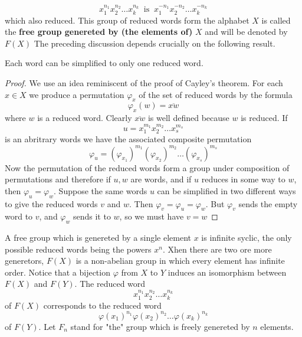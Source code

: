  \begin{equation*}
     x_1^{n_1}x_2^{n_2}\dotsc x_k^{n_k} \ \text{ is }\  x_1^{-n_1}x_2^{-n_2}\dotsc x_k^{-n_k}
 \end{equation*}
 which also reduced. This group of reduced words form the alphabet $X$ is called the \textbf{free group genereted by (the elements of) } $X$ and will be denoted by $F(X)$
 The preceding discussion depends crucially on the following result.

 \begin{theoreme}\label{reducedword}
     Each word can be simplified to only one reduced word.
 \end{theoreme}

 \begin{proof}
     We use an idea reminiscent of the proof of Cayley's theorem. For each $x\in X$ we produce a permutation $\varphi_x$ of the set of reduced words by the formula
     \begin{equation*}
         \varphi_x(w)=\overline{xw}
     \end{equation*}
     where $w$ is a reduced word. Clearly $\overline{xw}$ is well defined because $w$ is reduced. If
     \begin{equation*}
         u=x_1^{m_1}x_2^{m_2}\dotsc x_s^{m_s}
     \end{equation*}
     is an abritrary words we have the associated composite permutation
     \begin{equation*}
         \varphi_u=(\varphi_{x_1})^{m_1}(\varphi_{x_2})^{m_2}\dotsc(\varphi_{x_s})^{m_s}
     \end{equation*}
     Now the permutation of the reduced words form a group under composition of permutations and therefore if $u,w$ are words, and if $u$ reduces in some way to $w$, then $\varphi_u=\varphi_w$. Suppose the same words $u$ can be simplified in two different ways to give the reduced words $v$ and $w$. Then $\varphi_v=\varphi_{u}=\varphi_w$. But $\varphi_v$ sends the empty word to $v$, and $\varphi_w$ sends it to $w$, so we must have $v=w$
 \end{proof}

A free group which is genereted by a single element $x$ is infinite syclic, the only possible reduced words being the powers $x^n$. Xhen there are two ore more generetors, $F(X)$ is a non-abelian group  in which every element has infinite order. Notice that a bijection $\varphi$ from $X$ to $Y$ induces an isomorphism between $F(X)$ and $F(Y)$. The reduced word
\begin{equation*}
    x_1^{n_1}x_2^{n_2}\dotsc x_k^{n_k}
\end{equation*}
of $F(X)$ corresponds to the reduced word
\begin{equation*}
    \varphi(x_1)^{n_1}\varphi(x_2)^{n_2}\dotsc \varphi(x_k)^{n_k}
\end{equation*}
of $F(Y)$. Let $F_n$ stand for "the" group which is freely genereted by $n$ elements.

